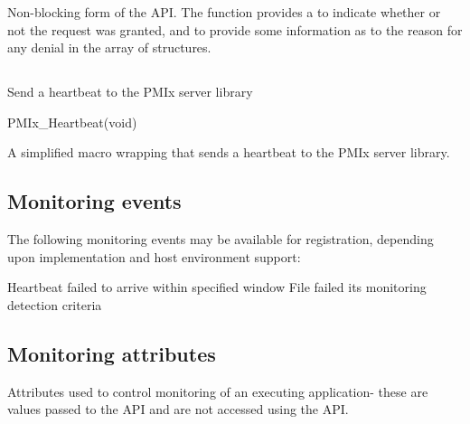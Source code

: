 \optattrend

\descr


Non-blocking form of the  \ac{API}. The  function provides a  to indicate whether or not the request was granted, and to provide some information as to the reason for any denial in the  array of  structures.

\subsection{}

\summary

Send a heartbeat to the \ac{PMIx} server library

\format

\cspecificstart
\begin{codepar}
PMIx_Heartbeat(void)
\end{codepar}
\cspecificend


\descr

A simplified macro wrapping  that sends a heartbeat to the \ac{PMIx} server library.

\subsection{Monitoring events}
\label{api:struct:events:monitor}

The following monitoring events may be available for registration, depending upon implementation and host environment support:

\begin{constantdesc}

%
Heartbeat failed to arrive within specified window
%
File failed its monitoring detection criteria

\end{constantdesc}

\subsection{Monitoring attributes}
\label{api:struct:attributes:monitor}

Attributes used to control monitoring of an executing application- these are values passed to the  \ac{API} and are not accessed using the  \ac{API}.

